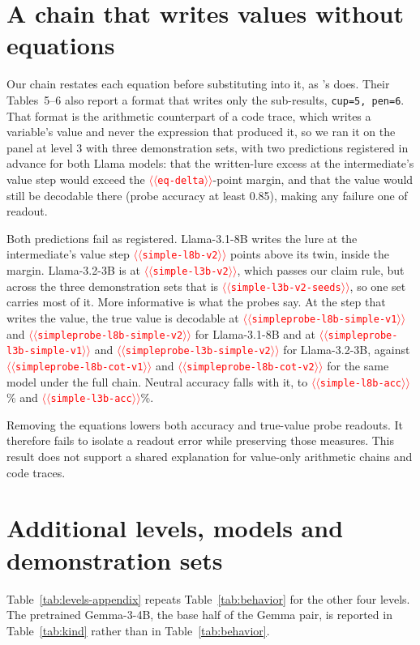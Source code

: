 \documentclass[11pt]{article}
\providecommand{\NUM}[1]{\textcolor{red}{$\langle\langle$\texttt{#1}$\rangle\rangle$}}
\begin{document}
\section{A chain that writes values without equations}
\label{app:simple}

Our chain restates each equation before substituting into it, as
\citeauthor{kudo2026faithful}'s does. Their Tables~5--6 also report a format that writes only the
sub-results, \texttt{cup=5, pen=6}. That format is the arithmetic counterpart of a code trace,
which writes a variable's value and never the expression that produced it, so we ran it on the
panel at level 3 with three demonstration sets, with two predictions registered in advance for both Llama models: that
the written-lure excess at the intermediate's value step would exceed the \NUM{eq-delta}-point
margin, and that the value would still be decodable there (probe accuracy at least 0.85), making
any failure one of readout.

Both predictions fail as registered. Llama-3.1-8B writes the lure at the intermediate's value
step \NUM{simple-l8b-v2} points above its twin, inside the margin. Llama-3.2-3B is at
\NUM{simple-l3b-v2}, which passes our claim rule, but across the three demonstration sets that
is \NUM{simple-l3b-v2-seeds}, so one set carries most of it. More informative is what the probes say. At
the step that writes the value, the true value is decodable at \NUM{simpleprobe-l8b-simple-v1}
and \NUM{simpleprobe-l8b-simple-v2} for Llama-3.1-8B and at
\NUM{simpleprobe-l3b-simple-v1} and \NUM{simpleprobe-l3b-simple-v2} for Llama-3.2-3B, against
\NUM{simpleprobe-l8b-cot-v1} and \NUM{simpleprobe-l8b-cot-v2} for the same model under the full
chain. Neutral accuracy falls with it, to \NUM{simple-l8b-acc}\% and \NUM{simple-l3b-acc}\%.

Removing the equations lowers both accuracy and true-value probe readouts. It therefore fails to isolate a readout error while preserving those measures. This result does not support a shared explanation for value-only arithmetic chains and code traces.

\section{Additional levels, models and demonstration sets}
Table~\ref{tab:levels-appendix} repeats Table~\ref{tab:behavior} for the other four levels.
The pretrained Gemma-3-4B, the base half of the Gemma pair, is reported in
Table~\ref{tab:kind} rather than in Table~\ref{tab:behavior}.
\end{document}

